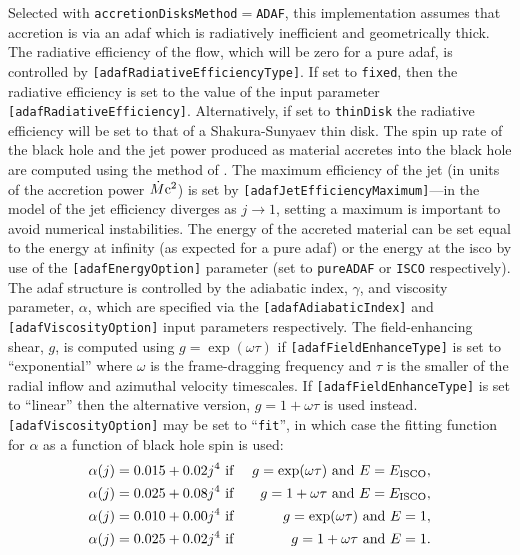 Selected with {\tt accretionDisksMethod}$=${\tt ADAF}, this implementation assumes that accretion is via an \gls{adaf} \citep{narayan_advection-dominated_1994} which is radiatively inefficient and geometrically thick. The radiative efficiency of the flow, which will be zero for a pure \gls{adaf}, is controlled by {\tt [adafRadiativeEfficiencyType]}. If set to {\tt fixed}, then the radiative efficiency is set to the value of the input parameter {\tt [adafRadiativeEfficiency]}. Alternatively, if set to {\tt thinDisk} the radiative efficiency will be set to that of a Shakura-Sunyaev thin disk. The spin up rate of the black hole and the jet power produced as material accretes into the black hole are computed using the method of \cite{benson_maximum_2009}. The maximum efficiency of the jet (in units of the accretion power $\dot{M} {\rm c}^2$) is set by {\tt [adafJetEfficiencyMaximum]}---in the model of \cite{benson_maximum_2009} the jet efficiency diverges as $j\rightarrow 1$, setting a maximum 
is important to avoid numerical instabilities. The energy of the accreted material can be set equal to the energy at infinity (as expected for a pure \gls{adaf}) or the energy at the \gls{isco} by use of the {\tt [adafEnergyOption]} parameter (set to {\tt pureADAF} or {\tt ISCO} respectively). The \gls{adaf} structure is controlled by the adiabatic index, $\gamma$, and viscosity parameter, $\alpha$, which are specified via the {\tt [adafAdiabaticIndex]} and {\tt [adafViscosityOption]} input parameters respectively. The field-enhancing shear, $g$, is computed using $g=\exp(\omega \tau)$ if {\tt [adafFieldEnhanceType]} is set to ``exponential'' where $\omega$ is the frame-dragging frequency and $\tau$ is the smaller of the radial inflow and azimuthal velocity timescales. If  {\tt [adafFieldEnhanceType]} is set to ``linear'' then the alternative version, $g=1+\omega \tau$ is used instead. {\tt [adafViscosityOption]} may be set to ``{\tt fit}'', in which case the fitting function for $\alpha$ as a function of black hole 
spin is used:
\begin{eqnarray}
\alpha(j)=0.015+0.02 j^4 & \hbox{ if  }& g=\exp(\omega\tau) \hbox{ and } E=E_{\rm ISCO}, \\
\alpha(j)=0.025+0.08 j^4 & \hbox{ if } & g=1+\omega\tau \hbox{ and } E=E_{\rm ISCO}, \\
\alpha(j)=0.010+0.00 j^4 & \hbox{ if } & g=\exp(\omega\tau) \hbox{ and } E=1, \\
\alpha(j)=0.025+0.02 j^4 & \hbox{ if } & g=1+\omega\tau \hbox{ and } E=1.  
\end{eqnarray}

